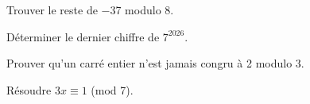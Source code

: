 \documentclass[11pt]{article}
\begin{document}
Trouver le reste de −37 modulo 8.\par
\vspace{5pt}
Déterminer le dernier chiffre de \(7^{2026}\).\par
\vspace{5pt}
Prouver qu’un carré entier n’est jamais congru à 2 modulo 3.\par
\vspace{5pt}
Résoudre \(3x \equiv  1\) (mod 7).\par
\vspace{5pt}
\end{document}
